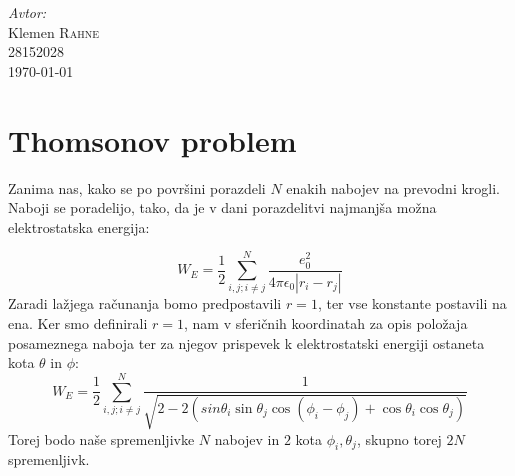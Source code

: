 \documentclass[slovene,11pt,a4paper]{article}
\numberwithin{equation}{section} %
\numberwithin{figure}{section} %
\numberwithin{table}{section} %
\begin{document}
\begin{titlepage}



\Large \emph{Avtor:}\\
Klemen \textsc{Rahne}\\
28152028\\[2cm]

{\large \today } \\[0.5cm] %

	

\end{titlepage}





\tableofcontents


\section{Thomsonov problem}
Zanima nas, kako se po površini porazdeli $N$ enakih nabojev na prevodni krogli. Naboji se poradelijo, tako, da je v dani porazdelitvi najmanjša možna elektrostatska energija:

\begin{equation}
W_{E}=\frac{1}{2}\sum_{i,j;i\neq j}^N \frac{e_0^2}{4 \pi \epsilon_0 |r_i-r_j|}
\end{equation}
Zaradi lažjega računanja bomo predpostavili $r=1$, ter vse konstante postavili na ena. Ker smo definirali $r=1$, nam v sferičnih koordinatah za opis položaja posameznega naboja ter za njegov prispevek k elektrostatski energiji ostaneta kota $\theta$ in $\phi$:
\begin{equation}
W_{E}=\frac{1}{2}\sum_{i,j;i\neq j}^N \frac{1}{\sqrt{2-2(sin\theta_i \sin\theta_j \cos(\phi_i - \phi_j)+\cos \theta_i \cos \theta_j)}}
\end{equation}
Torej bodo naše spremenljivke $N$ nabojev in $2$ kota $\phi_i, \theta_j$, skupno torej $2N$ spremenljivk. 
\end{document}
